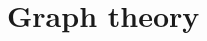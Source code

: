 \documentclass[12pt]{report}
\begin{document}
\chapter{Graph theory}
\label{chap:graphtheory}
\end{document}
